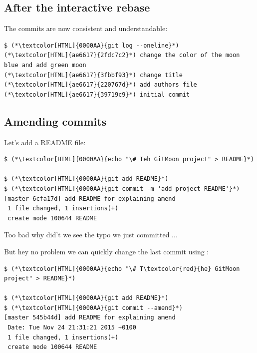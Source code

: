\subsection{After the interactive rebase}
\begin{frame}[fragile]
  \subslidetitle

  The commits are now consistent and understandable:
  \begin{lstlisting}
$ (*\textcolor[HTML]{0000AA}{git log --oneline}*)
(*\textcolor[HTML]{ae6617}{2fdc7c2}*) change the color of the moon blue and add green moon
(*\textcolor[HTML]{ae6617}{3fbbf93}*) change title
(*\textcolor[HTML]{ae6617}{220767d}*) add authors file
(*\textcolor[HTML]{ae6617}{39719c9}*) initial commit
\end{lstlisting}

\end{frame}


\subsection{Amending commits}
\begin{frame}[fragile]
  \subslidetitle

  Let's add a README file:

  \begin{lstlisting}
$ (*\textcolor[HTML]{0000AA}{echo "\# Teh GitMoon project" > README}*)

$ (*\textcolor[HTML]{0000AA}{git add README}*)
$ (*\textcolor[HTML]{0000AA}{git commit -m 'add project README'}*)
[master 6cfa17d] add README for explaining amend
 1 file changed, 1 insertions(+)
 create mode 100644 README
\end{lstlisting}

  Too bad why did't we see the typo we just committed ...

  But hey no problem we can quickly change the last commit using :

  \begin{lstlisting}
$ (*\textcolor[HTML]{0000AA}{echo "\# T\textcolor{red}{he} GitMoon project" > README}*)

$ (*\textcolor[HTML]{0000AA}{git add README}*)
$ (*\textcolor[HTML]{0000AA}{git commit --amend}*)
[master 545b44d] add README for explaining amend
 Date: Tue Nov 24 21:31:21 2015 +0100
 1 file changed, 1 insertions(+)
 create mode 100644 README
\end{lstlisting}

\end{frame}

